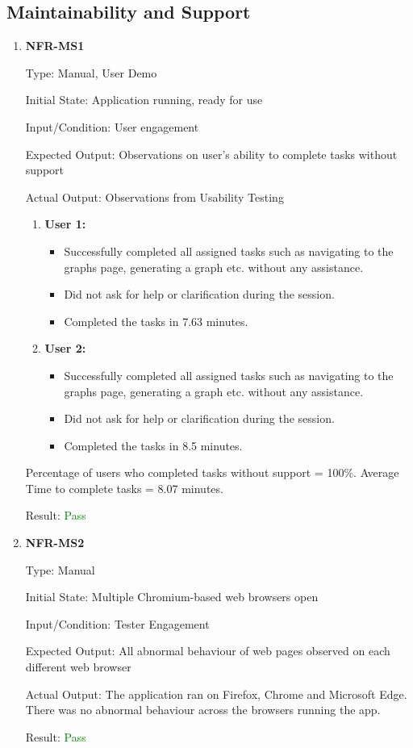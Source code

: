\documentclass[12pt, titlepage]{article}
\begin{document}
\subsection{Maintainability and Support}
\begin{enumerate}
\item{\textbf{NFR-MS1}} \label{NFR:MS1}

Type: Manual, User Demo

Initial State: Application running, ready for use

Input/Condition: User engagement

Expected Output: Observations on user's ability to complete tasks without
support

Actual Output: \newline
Observations from Usability Testing 
\begin{enumerate}
  \item \textbf{User 1:}
  \begin{itemize}
    \item Successfully completed all assigned tasks such as navigating to the
    graphs page, generating a graph etc. without any assistance.
    \item Did not ask for help or clarification during the session.
    \item Completed the tasks in 7.63 minutes.
  \end{itemize}
  \item \textbf{User 2:}
  \begin{itemize}
    \item Successfully completed all assigned tasks such as navigating to the
    graphs page, generating a graph etc. without any assistance.
    \item Did not ask for help or clarification during the session.
    \item Completed the tasks in 8.5 minutes.
  \end{itemize}
\end{enumerate}
Percentage of users who completed tasks without support = 100\%. Average Time to
complete tasks = 8.07 minutes.

Result: \textcolor{green}{Pass}
					
\item{\textbf{NFR-MS2}} \label{NFR:MS2}

Type: Manual

Initial State: Multiple Chromium-based web browsers open

Input/Condition: Tester Engagement

Expected Output: All abnormal behaviour of web pages observed on each different
web browser

Actual Output: The application ran on Firefox, Chrome and Microsoft Edge. There
was no abnormal behaviour across the browsers running the app. 

Result: \textcolor{green}{Pass}
\end{enumerate}
\end{document}

